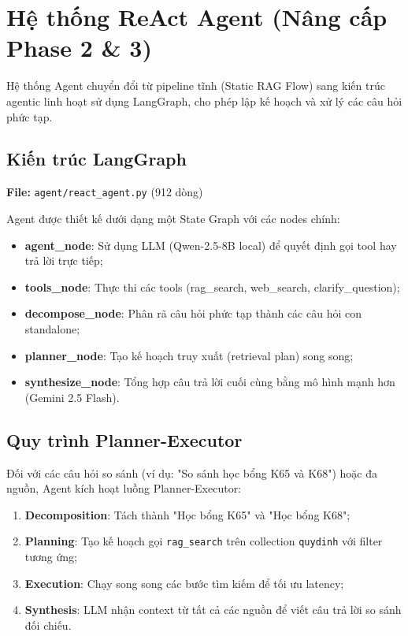 \documentclass[../DoAn.tex]{subfiles}
\begin{document}

\section{Hệ thống ReAct Agent (Nâng cấp Phase 2 \& 3)}

Hệ thống Agent chuyển đổi từ pipeline tĩnh (Static RAG Flow) sang kiến trúc agentic linh hoạt sử dụng LangGraph, cho phép lập kế hoạch và xử lý các câu hỏi phức tạp.

\subsection{Kiến trúc LangGraph}
\textbf{File:} \texttt{agent/react_agent.py} (912 dòng)

Agent được thiết kế dưới dạng một State Graph với các nodes chính:
\begin{itemize}
    \item \textbf{agent\_node}: Sử dụng LLM (Qwen-2.5-8B local) để quyết định gọi tool hay trả lời trực tiếp;
    \item \textbf{tools\_node}: Thực thi các tools (rag\_search, web\_search, clarify\_question);
    \item \textbf{decompose\_node}: Phân rã câu hỏi phức tạp thành các câu hỏi con standalone;
    \item \textbf{planner\_node}: Tạo kế hoạch truy xuất (retrieval plan) song song;
    \item \textbf{synthesize\_node}: Tổng hợp câu trả lời cuối cùng bằng mô hình mạnh hơn (Gemini 2.5 Flash).
\end{itemize}

\subsection{Quy trình Planner-Executor}
Đối với các câu hỏi so sánh (ví dụ: "So sánh học bổng K65 và K68") hoặc đa nguồn, Agent kích hoạt luồng Planner-Executor:
\begin{enumerate}
    \item \textbf{Decomposition}: Tách thành "Học bổng K65" và "Học bổng K68";
    \item \textbf{Planning}: Tạo kế hoạch gọi \texttt{rag_search} trên collection \texttt{quydinh} với filter tương ứng;
    \item \textbf{Execution}: Chạy song song các bước tìm kiếm để tối ưu latency;
    \item \textbf{Synthesis}: LLM nhận context từ tất cả các nguồn để viết câu trả lời so sánh đối chiếu.
\end{enumerate}
\end{document}
